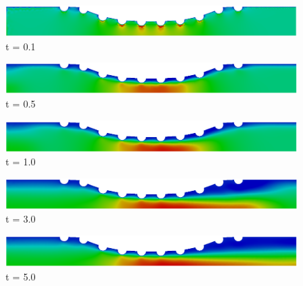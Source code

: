 \vspace{2cm} 
\begin{figure}[H]
     \begin{minipage}{.50\linewidth}
      \centering
      \includegraphics[scale=0.18]{./02_chaps/cap_solution/figure/vel_CurvedStrut1.png}\\
      t = 0.1
     \end{minipage}%
     \begin{minipage}{.50\linewidth}
      \centering
      \includegraphics[scale=0.18]{./02_chaps/cap_solution/figure/vel_CurvedStrut2.png}\\
      t = 0.5
     \end{minipage}
     \begin{minipage}{.50\linewidth}
     \medskip
      \centering
      \includegraphics[scale=0.18]{./02_chaps/cap_solution/figure/vel_CurvedStrut3.png}\\
      t = 1.0
     \end{minipage}%
     \begin{minipage}{.50\linewidth}
     \medskip
      \centering
      \includegraphics[scale=0.18]{./02_chaps/cap_solution/figure/vel_CurvedStrut4.png}\\
      t = 3.0
     \end{minipage}
     \begin{minipage}{.50\linewidth}
      \centering
      \includegraphics[scale=0.18]{./02_chaps/cap_solution/figure/vel_CurvedStrut5.png}\\
      t = 5.0
     \end{minipage}%

\end{figure}
